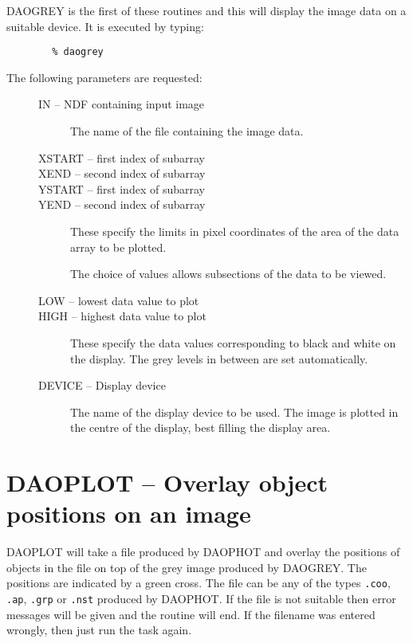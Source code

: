 DAOGREY is the first of these routines and this will display the image data on a
suitable device.
It is executed by typing:

\begin{verbatim}
        % daogrey
\end{verbatim}

The following parameters are requested:

\begin{description}
\item[\mbox{}]\mbox{}
\begin{description}
\item[IN -- NDF containing input image]
The name of the file containing the image data.
\item[XSTART -- first index of subarray]
\item[XEND  -- second index of subarray]
\item[YSTART -- first index of subarray]
\item[YEND  -- second index of subarray]

These specify the limits in pixel coordinates of the area of the data array to
be plotted.

The choice of values allows subsections of the data to be viewed.

\item[LOW -- lowest data value to plot]
\item[HIGH -- highest data value to plot]

These specify the data values corresponding to black and white on the display.
The grey levels in between are set automatically.

\item[DEVICE -- Display device]

The name of the display device to be used.
The image is plotted in the centre of the display, best filling the display
area.

\end{description}
\end{description}

\section{DAOPLOT -- Overlay object positions on an image}
\label{sec:daoplot}

DAOPLOT will take a file produced by DAOPHOT and overlay the positions of objects
in the file on top of the grey image produced by DAOGREY. The positions are
indicated by a green cross. The file can be any of the types {\tt .coo}, {\tt .ap},
{\tt .grp} or {\tt .nst} produced by DAOPHOT. If the file is not suitable then
error messages will be given and the routine will end. If the filename was entered
wrongly, then just run the task again.

